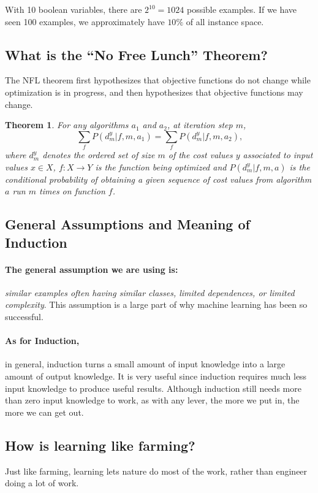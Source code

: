 \documentclass[12pt]{article}
\newtheorem{theorem}{Theorem}%
\begin{document}
With 10 boolean variables, there are $2^{10} = 1024$ possible examples. If we
have seen 100 examples, we approximately have $10\%$ of all instance space.

\subsection{What is the ``No Free Lunch'' Theorem?}

The NFL theorem first hypothesizes that objective functions do not change while
optimization is in progress, and then hypothesizes that objective functions may
change.

\begin{theorem}
    For any algorithms $a_1$ and $a_2$, at iteration step $m$,
    \[\sum_f P\left(d_m^y|f,m,a_1\right)=\sum_f P(d_m^y|f,m,a_2)\text{,}\]
    where $d_m^y$ denotes the ordered set of size $m$ of the cost values $y$
    associated to input values $x\in X$, $f:X \rightarrow Y$ is the function
    being optimized and $P(d_m^y|f,m,a)$ is the conditional probability of
    obtaining a given sequence of cost values from algorithm $a$ run $m$ times
    on function $f$.
\end{theorem}

\subsection{General Assumptions and Meaning of Induction}

\paragraph{The general assumption we are using is:} \emph{similar examples
often having similar classes, limited dependences, or limited complexity}. This
assumption is a large part of why machine learning has been so successful.

\paragraph{As for Induction,} in general, induction turns a small amount of
input knowledge into a large amount of output knowledge. It is very useful
since induction requires much less input knowledge to produce useful results.
Although induction still needs more than zero input knowledge to work, as with
any lever, the more we put in, the more we can get out.

\subsection{How is learning like farming? }

Just like farming, learning lets nature do most of the work, rather than
engineer doing a lot of work.


{}

\end{document}
